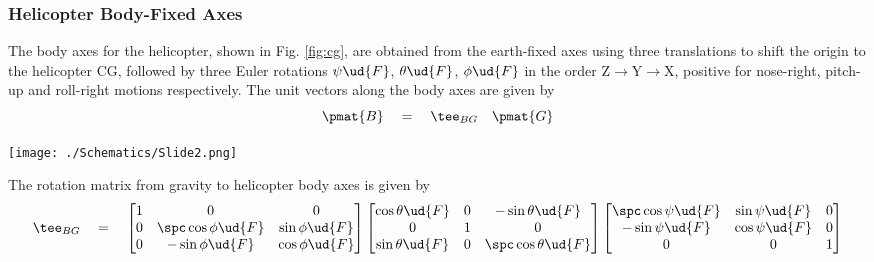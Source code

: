 \subsubsection{Helicopter Body-Fixed Axes}
\label{sec:hba}
The body axes for the helicopter, shown in Fig. \ref{fig:cg}, are obtained from the earth-fixed axes using three translations to shift the origin to the helicopter CG, followed by three Euler rotations $\psi\ud{F}$, $\theta\ud{F}$, $\phi\ud{F}$ in the order Z$\rightarrow$Y$\rightarrow$X, positive for nose-right, pitch-up and roll-right motions respectively. The unit vectors along the body axes are given by
\begin{equation}
\pmat{B} \quad = \quad \tee_{BG} \quad \pmat{G}
\end{equation}
\linebreak
\begin{Figure}
 \centering
 \texttt{[image: ./Schematics/Slide2.png]}
 \vspace{-0.5cm}
 \label{fig:cg}
\end{Figure}
\vspace{0.5cm}
The rotation matrix from gravity to helicopter body axes is given by \\
\begin{equation}
\label{eqn:TBG}
\tee_{BG} \quad = \quad \begin{bmatrix} 1 & 0 & 0 \\ 0 & \spc \cos \phi\ud{F} & \sin \phi\ud{F} \\ 0 & -\sin \phi\ud{F} & \cos \phi\ud{F} \end{bmatrix} \begin{bmatrix} \cos \theta\ud{F} & 0 & -\sin \theta\ud{F} \\ 0 & 1 & 0 \\ \sin \theta\ud{F} & 0 & \spc \cos \theta\ud{F} \end{bmatrix} \begin{bmatrix} \spc \cos \psi\ud{F} & \sin \psi\ud{F} & 0 \\
-\sin \psi\ud{F} & \cos \psi\ud{F} & 0 \\
0 & 0 & 1 \end{bmatrix}
\end{equation}
